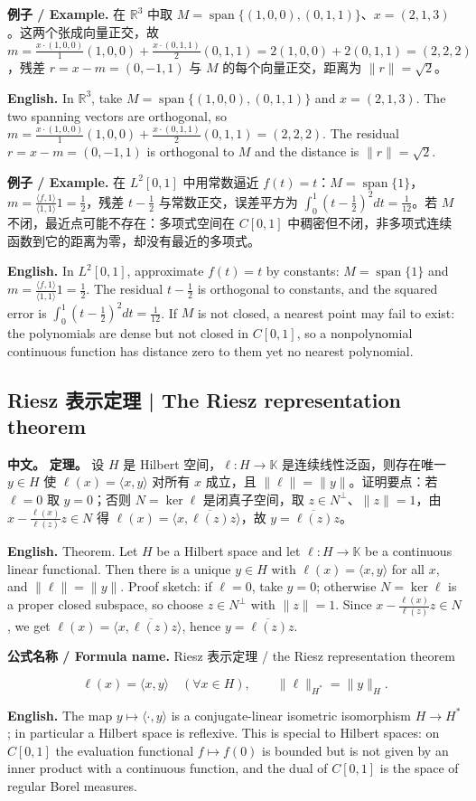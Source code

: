 \documentclass[UTF8,11pt,a4paper]{ctexart}
\newcommand{\EN}[1]{\par\noindent \textbf{English.} #1\par}
\newcommand{\FORMULA}[2]{\par\noindent\textbf{公式名称 / Formula name.} #1 / #2\par}
\newcommand{\EX}[2]{\par\noindent \textbf{例子 / Example.} #1\par\EN{#2}}
\newcommand{\APS}[2]{\par\noindent\textbf{中文。} #1\par\noindent\textbf{English.} #2\par\smallskip}
\begin{document}
\EX{在 $\mathbb R^3$ 中取 $M=\operatorname{span}\{(1,0,0),(0,1,1)\}$、$x=(2,1,3)$。这两个张成向量正交，故 $m=\frac{x\cdot(1,0,0)}{1}(1,0,0)+\frac{x\cdot(0,1,1)}{2}(0,1,1)=2(1,0,0)+2(0,1,1)=(2,2,2)$，残差 $r=x-m=(0,-1,1)$ 与 $M$ 的每个向量正交，距离为 $\|r\|=\sqrt2$。}{In $\mathbb R^3$, take $M=\operatorname{span}\{(1,0,0),(0,1,1)\}$ and $x=(2,1,3)$. The two spanning vectors are orthogonal, so $m=\frac{x\cdot(1,0,0)}{1}(1,0,0)+\frac{x\cdot(0,1,1)}{2}(0,1,1)=(2,2,2)$. The residual $r=x-m=(0,-1,1)$ is orthogonal to $M$ and the distance is $\|r\|=\sqrt2$.}

\EX{在 $L^2[0,1]$ 中用常数逼近 $f(t)=t$：$M=\operatorname{span}\{1\}$，$m=\frac{\langle f,1\rangle}{\langle1,1\rangle}1=\frac12$，残差 $t-\frac12$ 与常数正交，误差平方为 $\int_0^1(t-\frac12)^2dt=\frac1{12}$。若 $M$ 不闭，最近点可能不存在：多项式空间在 $C[0,1]$ 中稠密但不闭，非多项式连续函数到它的距离为零，却没有最近的多项式。}{In $L^2[0,1]$, approximate $f(t)=t$ by constants: $M=\operatorname{span}\{1\}$ and $m=\frac{\langle f,1\rangle}{\langle1,1\rangle}1=\frac12$. The residual $t-\frac12$ is orthogonal to constants, and the squared error is $\int_0^1(t-\frac12)^2dt=\frac1{12}$. If $M$ is not closed, a nearest point may fail to exist: the polynomials are dense but not closed in $C[0,1]$, so a nonpolynomial continuous function has distance zero to them yet no nearest polynomial.}

\subsection{Riesz 表示定理 | The Riesz representation theorem}
\APS{\textbf{定理。} 设 $H$ 是 Hilbert 空间，$\ell:H\to\mathbb K$ 是连续线性泛函，则存在唯一 $y\in H$ 使 $\ell(x)=\langle x,y\rangle$ 对所有 $x$ 成立，且 $\|\ell\|=\|y\|$。证明要点：若 $\ell=0$ 取 $y=0$；否则 $N=\ker\ell$ 是闭真子空间，取 $z\in N^\perp$、$\|z\|=1$，由 $x-\frac{\ell(x)}{\ell(z)}z\in N$ 得 $\ell(x)=\langle x,\overline{\ell(z)}z\rangle$，故 $y=\overline{\ell(z)}z$。}{Theorem. Let $H$ be a Hilbert space and let $\ell:H\to\mathbb K$ be a continuous linear functional. Then there is a unique $y\in H$ with $\ell(x)=\langle x,y\rangle$ for all $x$, and $\|\ell\|=\|y\|$. Proof sketch: if $\ell=0$, take $y=0$; otherwise $N=\ker\ell$ is a proper closed subspace, so choose $z\in N^\perp$ with $\|z\|=1$. Since $x-\frac{\ell(x)}{\ell(z)}z\in N$, we get $\ell(x)=\langle x,\overline{\ell(z)}z\rangle$, hence $y=\overline{\ell(z)}z$.}
\FORMULA{Riesz 表示定理}{the Riesz representation theorem}
\[
\ell(x)=\langle x,y\rangle\quad(\forall x\in H),
\qquad
\|\ell\|_{H^*}=\|y\|_H.
\]
\EN{The map $y\mapsto\langle\cdot,y\rangle$ is a conjugate-linear isometric isomorphism $H\to H^*$; in particular a Hilbert space is reflexive. This is special to Hilbert spaces: on $C[0,1]$ the evaluation functional $f\mapsto f(0)$ is bounded but is not given by an inner product with a continuous function, and the dual of $C[0,1]$ is the space of regular Borel measures.}
\end{document}
